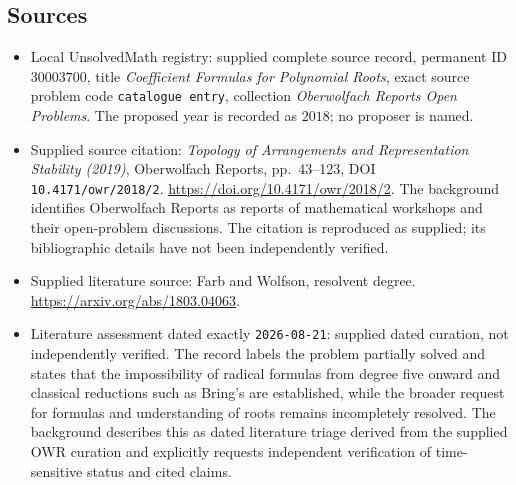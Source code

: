 \documentclass[11pt]{article}
\begin{document}
\subsection{Sources}
\begin{itemize}
\item Local UnsolvedMath registry: supplied complete source record, permanent ID \(30003700\), title \emph{Coefficient Formulas for Polynomial Roots}, exact source problem code \texttt{catalogue entry}, collection \emph{Oberwolfach Reports Open Problems}. The proposed year is recorded as \(2018\); no proposer is named.
\item Supplied source citation: \emph{Topology of Arrangements and Representation Stability (2019)}, Oberwolfach Reports, pp.~43--123, DOI \texttt{10.4171/owr/2018/2}. \url{https://doi.org/10.4171/owr/2018/2}. The background identifies Oberwolfach Reports as reports of mathematical workshops and their open-problem discussions. The citation is reproduced as supplied; its bibliographic details have not been independently verified.
\item Supplied literature source: Farb and Wolfson, resolvent degree. \url{https://arxiv.org/abs/1803.04063}.
\item Literature assessment dated exactly \texttt{2026-08-21}: supplied dated curation, not independently verified. The record labels the problem partially solved and states that the impossibility of radical formulas from degree five onward and classical reductions such as Bring's are established, while the broader request for formulas and understanding of roots remains incompletely resolved. The background describes this as dated literature triage derived from the supplied OWR curation and explicitly requests independent verification of time-sensitive status and cited claims.
\end{itemize}
\end{document}
